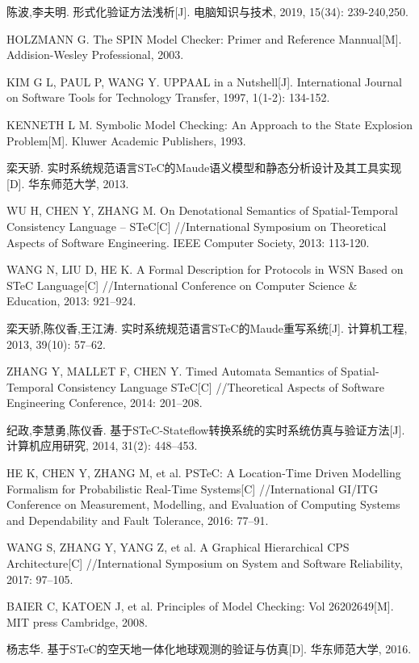 \begin{thebibliography}{2}
陈波,李夫明. 形式化验证方法浅析[J]. 电脑知识与技术, 2019, 15(34): 239-240,250.

HOLZMANN G. The SPIN Model Checker: Primer and Reference Mannual[M]. Addision-Wesley Professional, 2003.

KIM G L, PAUL P, WANG Y. UPPAAL in a Nutshell[J]. International Journal on Software Tools for Technology Transfer, 1997, 1(1-2): 134-152.

KENNETH L M. Symbolic Model Checking: An Approach to the State Explosion Problem[M]. Kluwer Academic Publishers, 1993.

栾天骄. 实时系统规范语言STeC的Maude语义模型和静态分析设计及其工具实现[D]. 华东师范大学, 2013.

WU H, CHEN Y, ZHANG M. On Denotational Semantics of Spatial-Temporal Consistency Language -- STeC[C] //International Symposium on Theoretical Aspects of Software Engineering. IEEE Computer Society, 2013: 113-120.

WANG N, LIU D, HE K. A Formal Description for Protocols in WSN Based on STeC Language[C] //International Conference on Computer Science \& Education, 2013: 921–924.

栾天骄,陈仪香,王江涛. 实时系统规范语言STeC的Maude重写系统[J]. 计算机工程, 2013, 39(10): 57–62.

ZHANG Y, MALLET F, CHEN Y. Timed Automata Semantics of Spatial-Temporal Consistency Language STeC[C] //Theoretical Aspects of Software Engineering Conference, 2014: 201–208.

纪政,李慧勇,陈仪香. 基于STeC-Stateﬂow转换系统的实时系统仿真与验证方法[J]. 计算机应用研究, 2014, 31(2): 448–453.

HE K, CHEN Y, ZHANG M, et al. PSTeC: A Location-Time Driven Modelling Formalism for Probabilistic Real-Time Systems[C] //International GI/ITG Conference on Measurement, Modelling, and Evaluation of Computing Systems and Dependability and Fault Tolerance, 2016: 77–91.

WANG S, ZHANG Y, YANG Z, et al. A Graphical Hierarchical CPS Architecture[C] //International Symposium on System and Software Reliability, 2017: 97–105.

BAIER C, KATOEN J, et al. Principles of Model Checking: Vol 26202649[M]. MIT press Cambridge, 2008.

杨志华. 基于STeC的空天地一体化地球观测的验证与仿真[D]. 华东师范大学, 2016.


\end{thebibliography}
